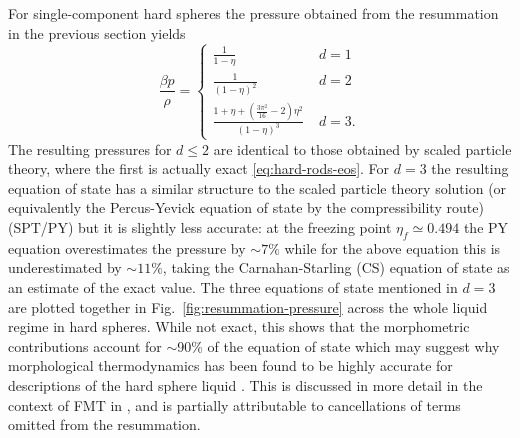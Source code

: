 \documentclass[11pt,twoside]{report}
\begin{document}
For single-component hard spheres the pressure obtained from the resummation in the previous section yields
\begin{equation}
  \frac{\beta p}{\rho} =
  \begin{cases}
    \frac{1}{1-\eta} & \; d=1 \\
    \frac{1}{(1-\eta)^2} & \; d=2 \\
    \frac{1 + \eta + (\frac{3\pi^2}{16} - 2) \eta^2}{(1-\eta)^3} & \; d=3.
  \end{cases}
\end{equation}
The resulting pressures for $d \le 2$ are identical to those obtained by scaled particle theory, where the first is actually exact \eqref{eq:hard-rods-eos}.
For $d=3$ the resulting equation of state has a similar structure to the scaled particle theory solution (or equivalently the Percus-Yevick equation of state by the compressibility route) (SPT/PY) but it is slightly less accurate: at the freezing point $\eta_f \simeq 0.494$ the PY equation overestimates the pressure by $\sim7\%$ while for the above equation this is underestimated by $\sim11\%$, taking the Carnahan-Starling (CS) equation of state \cite{CarnahanJCP1969} as an estimate of the exact value.
The three equations of state mentioned in $d=3$ are plotted together in Fig.\ \ref{fig:resummation-pressure} across the whole liquid regime in hard spheres.
While not exact, this shows that the morphometric contributions account for $\sim$90\% of the equation of state which may suggest why morphological thermodynamics has been found to be highly accurate for descriptions of the hard sphere liquid \cite{RothPRL2006,LairdPRE2012,BlokhuisPRE2013,UrrutiaPRE2014,Hansen-GoosJCP2014,RobinsonPRL2019}.
This is discussed in more detail in the context of FMT in \cite{MarechalPRE2014}, and is partially attributable to cancellations of terms omitted from the resummation.
\end{document}
